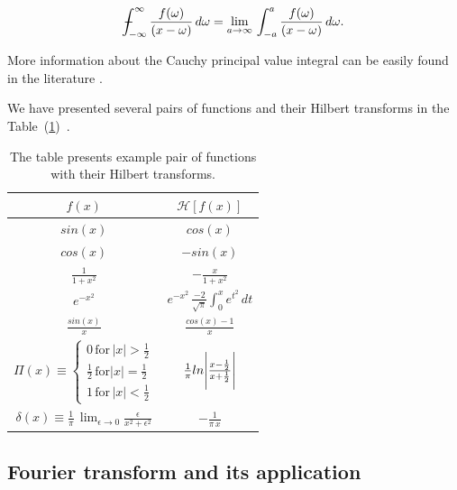 \documentclass[12pt,twoside,a4paper]{article}
\numberwithin{equation}{subsection}
\numberwithin{figure}{subsection}
\def\Xint#1{\mathchoice
{\XXint\displaystyle\textstyle{#1}}%
{\XXint\textstyle\scriptstyle{#1}}%
{\XXint\scriptstyle\scriptscriptstyle{#1}}%
{\XXint\scriptscriptstyle\scriptscriptstyle{#1}}%
\!\int}
\def\XXint#1#2#3{{\setbox0=\hbox{$#1{#2#3}{\int}$ }\vcenter{\hbox{$#2#3$ }}\kern-.6\wd0}}
\def\dashint{\Xint-}
\begin{document}
\begin{equation} \label{eq:mathematical_cvp}
	\dashint_{ - \infty }^{\infty } \frac{f(\omega)}{(x - \omega)} \, d\omega = \lim_{a \to \infty}\,\int_{ - a}^{a }
	\frac{f(\omega)}{(x - \omega)} \, d\omega . 
\end{equation}

More information about the Cauchy principal value integral can be easily found in the literature \cite{henrici_applied}.

We have presented several pairs of functions and their Hilbert transforms in the
Table~(\ref{tab:mathematical_hexample})~\cite{weisstein_hilbert}.

\begin{table} 
  \centering
  \begin{tabular}{c | c}
    \hline \hline    
      $ f(x) $             & $ \mathcal{H}[f(x)] $ \\ 
    \hline \hline 
      $ sin(x) $           & $ cos(x) $ \\ 
    \hline
      $ cos(x) $           & $ - sin(x) $ \\ 
    \hline
      $ \frac{1}{1+x^2} $  & $ - \frac{x}{1 + x^2} $ \\ 
    \hline
      $ e^{-x^2} $         & $ e^{-x^2} \, \frac{ - 2 }{\sqrt{\pi}} \int_{0}^{x} e^{t^2} \, dt$ \\ 
    \hline
      $ \frac{sin(x)}{x} $ & $ \frac{cos(x)-1}{x} $ \\ 
    \hline
      $ \Pi(x) \equiv %
      \begin{cases} 
       0 \, \text{for}\, |x| > \frac{1}{2} \\
       \frac{1}{2}\, \text{for} |x| = \frac{1}{2} \\
       1\, \text{for}\, |x| < \frac{1}{2}
      \end{cases}        $ & $ \frac{1}{\pi} ln \Bigg{|} \frac{x - \frac{1}{2}}{x + \frac{1}{2}} \Bigg{|}  $ \\ 
    \hline
      $ \delta(x) \equiv \frac{1}{\pi} \, \lim_{\epsilon \to 0} \frac{\epsilon}{x ^ 2 + \epsilon ^ 2} 
                         $ & $ - \frac{1}{\pi \, x} $ \\
    \hline  
  \end{tabular} 
  \caption{The table presents example pair of functions with their Hilbert transforms.}
  \label{tab:mathematical_hexample}
\end{table}

\subsection{Fourier transform and its application}
 
\end{document}
